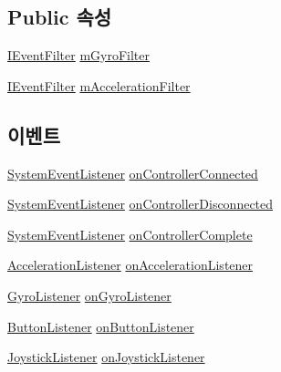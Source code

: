 \subsection*{Public 속성}
\begin{DoxyCompactItemize}
\item 
\hyperlink{interface_i_event_filter}{I\+Event\+Filter} \hyperlink{class_event_manager_a7cee85488f5d7220c102cd945b1f494a}{m\+Gyro\+Filter}
\item 
\hyperlink{interface_i_event_filter}{I\+Event\+Filter} \hyperlink{class_event_manager_a2e8707f51be09be7f400bd9cca230b3a}{m\+Acceleration\+Filter}
\end{DoxyCompactItemize}
\subsection*{이벤트}
\begin{DoxyCompactItemize}
\item 
\hyperlink{class_event_manager_a65e017fcb7c22959f09becc40ad3bc2d}{System\+Event\+Listener} \hyperlink{class_event_manager_a1982ee974be3949930955adbf2b69416}{on\+Controller\+Connected}
\item 
\hyperlink{class_event_manager_a65e017fcb7c22959f09becc40ad3bc2d}{System\+Event\+Listener} \hyperlink{class_event_manager_a8f4ec7cfc6f0ca0d4a5872997b359861}{on\+Controller\+Disconnected}
\item 
\hyperlink{class_event_manager_a65e017fcb7c22959f09becc40ad3bc2d}{System\+Event\+Listener} \hyperlink{class_event_manager_af12f0caee161b1b2222cfd13cd957750}{on\+Controller\+Complete}
\item 
\hyperlink{class_event_manager_ac459bcb4ba4f140243e271628f8d366c}{Acceleration\+Listener} \hyperlink{class_event_manager_a653a885d332bd10bf53a1f8e6a8c36cd}{on\+Acceleration\+Listener}
\item 
\hyperlink{class_event_manager_a4ed9f5be26f2015a5cc107257f02eff8}{Gyro\+Listener} \hyperlink{class_event_manager_a31f1da96e98896421b0026df5ce01623}{on\+Gyro\+Listener}
\item 
\hyperlink{class_event_manager_ae17715b9a94a50d9a8e1f29580af7c16}{Button\+Listener} \hyperlink{class_event_manager_a6f4d5e2ed1262c99f3295743878ba681}{on\+Button\+Listener}
\item 
\hyperlink{class_event_manager_ad470a4c2e411d814dd480043332f2a70}{Joystick\+Listener} \hyperlink{class_event_manager_ab148217093b03a8cd7c962a11195c83a}{on\+Joystick\+Listener}
\end{DoxyCompactItemize}


